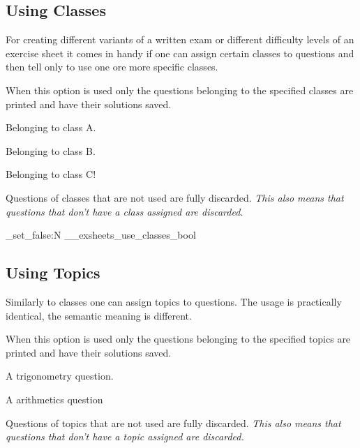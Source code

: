 \documentclass[DIV10,toc=index,toc=bib,numbers=noendperiod]{cnpkgdoc}
\begin{document}
\subsection{Using Classes}\label{sec:classes}
For creating different variants of a written exam or different difficulty
levels of an exercise sheet it comes in handy if one can assign certain
classes to questions and then tell \ExSheets only to use one ore more specific
classes.
\begin{beschreibung}
  \Default{}
    When this option is used only the questions belonging to the specified
    classes are printed and have their solutions saved.
\end{beschreibung}
\begin{beispiel}
 \begin{question}[class=A]
  Belonging to class A.
 \end{question}
 \begin{question}[class=B]
  Belonging to class B.
 \end{question}
 \begin{question}[class=C]
  Belonging to class C!
 \end{question}
\end{beispiel}
Questions of classes that are not used are fully discarded. \emph{This also
  means that questions that don't have a class assigned are discarded.}

\ExplSyntaxOn
 \bool_set_false:N \g__exsheets_use_classes_bool
\ExplSyntaxOff

\subsection{Using Topics}\label{sec:topics}
Similarly to classes one can assign topics to questions. The usage is practically
identical, the semantic meaning is different.
\begin{beschreibung}
  \Default{}
    When this option is used only the questions belonging to the specified
    topics are printed and have their solutions saved.
\end{beschreibung}
\begin{beispiel}
 \begin{question}[topic=trigonometry]
  A trigonometry question.
 \end{question}
 \begin{question}[topic=arithmetics]
  A arithmetics question
 \end{question}
\end{beispiel}
Questions of topics that are not used are fully discarded. \emph{This also
  means that questions that don't have a topic assigned are discarded.}
\end{document}
